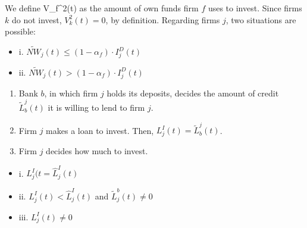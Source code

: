 \documentclass[11pt,]{article}
\begin{document}
We define V\_f\^{}2(t) as the amount of own funds firm \(f\) uses to
invest. Since firms \(k\) do not invest, \(V^2_k(t) = 0\), by
definition. Regarding firms \(j\), two situations are possible:

\begin{itemize}
  \item[] i. $\widetilde{NW}_j(t) \leq (1 - \alpha_f) \cdot I^D_j(t)$
  
  
  \item[] ii. $\widetilde{NW}_j(t) > (1 - \alpha_f) \cdot I^D_j(t)$
  
  
\end{itemize}

\begin{enumerate}
\def\labelenumi{\alph{enumi}.}
\setcounter{enumi}{2}
\item
  Bank \(b\), in which firm \(j\) holds its deposits, decides the amount
  of credit \(\widetilde{L}^j_b(t)\) it is willing to lend to firm
  \(j\).
\item
  Firm \(j\) makes a loan to invest. Then,
  \(L^I_j(t) = \widetilde{L}^j_b(t)\).
\item
  Firm \(j\) decides how much to invest.
\end{enumerate}

\begin{itemize}
  \item[] i. $L^I_j(t = \hat{L}^I_j(t)$
  
  
  \item[] ii. $L^I_j(t) < \hat{L}^I_j(t)$ and $\widetilde{L}_j^b(t) \neq 0$
  
  
  \item[] iii. $L^I_j(t) \neq 0$
  
\end{itemize}
\end{document}
